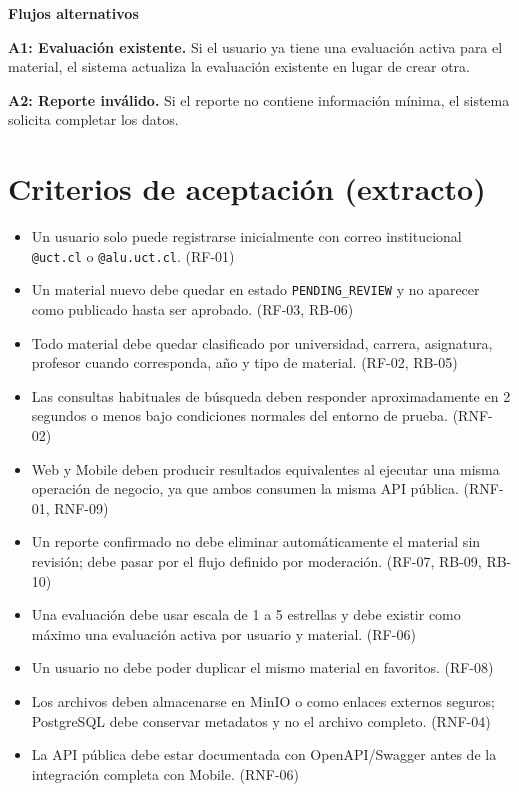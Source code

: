 \documentclass[12pt,a4paper]{article}
\begin{document}
\noindent\textbf{Flujos alternativos}

\noindent\textbf{A1: Evaluación existente.} Si el usuario ya tiene una evaluación activa para el material, el sistema actualiza la evaluación existente en lugar de crear otra.

\noindent\textbf{A2: Reporte inválido.} Si el reporte no contiene información mínima, el sistema solicita completar los datos.

\section{Criterios de aceptación (extracto)}

\begin{itemize}
    \item Un usuario solo puede registrarse inicialmente con correo institucional \texttt{@uct.cl} o \texttt{@alu.uct.cl}. (RF-01)
    \item Un material nuevo debe quedar en estado \texttt{PENDING\_REVIEW} y no aparecer como publicado hasta ser aprobado. (RF-03, RB-06)
    \item Todo material debe quedar clasificado por universidad, carrera, asignatura, profesor cuando corresponda, año y tipo de material. (RF-02, RB-05)
    \item Las consultas habituales de búsqueda deben responder aproximadamente en 2 segundos o menos bajo condiciones normales del entorno de prueba. (RNF-02)
    \item Web y Mobile deben producir resultados equivalentes al ejecutar una misma operación de negocio, ya que ambos consumen la misma API pública. (RNF-01, RNF-09)
    \item Un reporte confirmado no debe eliminar automáticamente el material sin revisión; debe pasar por el flujo definido por moderación. (RF-07, RB-09, RB-10)
    \item Una evaluación debe usar escala de 1 a 5 estrellas y debe existir como máximo una evaluación activa por usuario y material. (RF-06)
    \item Un usuario no debe poder duplicar el mismo material en favoritos. (RF-08)
    \item Los archivos deben almacenarse en MinIO o como enlaces externos seguros; PostgreSQL debe conservar metadatos y no el archivo completo. (RNF-04)
    \item La API pública debe estar documentada con OpenAPI/Swagger antes de la integración completa con Mobile. (RNF-06)
\end{itemize}
\end{document}
